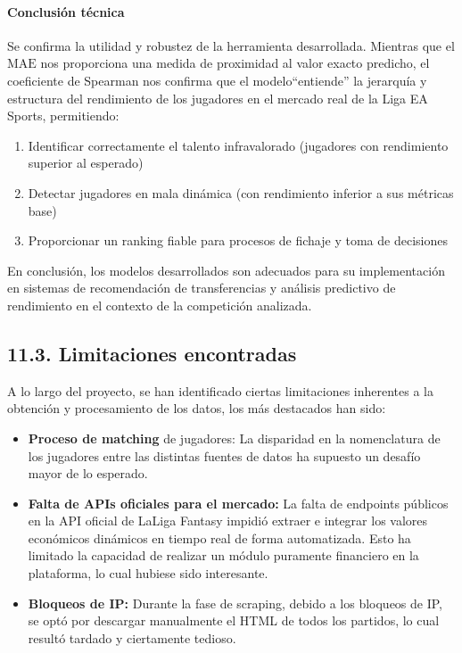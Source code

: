 \paragraph{Conclusión técnica}

Se confirma la utilidad y robustez de la herramienta
desarrollada. Mientras que el $\mathrm{MAE}$ nos proporciona una 
medida de proximidad al valor exacto predicho, el coeficiente de 
Spearman nos confirma que el modelo``entiende'' la 
jerarquía y estructura del rendimiento de los jugadores en el 
mercado real de la Liga EA Sports, permitiendo:

\begin{enumerate}
  \item Identificar correctamente el talento infravalorado
        (jugadores con rendimiento superior al esperado)
  
  \item Detectar jugadores en mala dinámica (con 
        rendimiento inferior a sus métricas base)
  
  \item Proporcionar un ranking fiable para procesos de 
        fichaje y toma de decisiones
\end{enumerate}

En conclusión, los modelos desarrollados son adecuados para su 
implementación en sistemas de recomendación de transferencias y 
análisis predictivo de rendimiento en el contexto de la 
competición analizada.

\subsection{11.3. Limitaciones encontradas}

A lo largo del proyecto, se han identificado ciertas limitaciones inherentes a la obtención y procesamiento de los datos, los más destacados han sido:
\begin{itemize}
    \item \textbf{Proceso de matching} de jugadores: La disparidad en la nomenclatura de los jugadores entre las distintas fuentes de datos ha supuesto un desafío mayor de lo esperado.
    \item \textbf{Falta de APIs oficiales para el mercado:} La falta de endpoints públicos en la API oficial de LaLiga Fantasy impidió extraer e integrar los valores económicos dinámicos en tiempo real de forma automatizada. Esto ha limitado la capacidad de realizar un módulo puramente financiero en la plataforma, lo cual hubiese sido interesante.
    \item \textbf{Bloqueos de IP:} Durante la fase de scraping, debido a los bloqueos de IP, se optó por descargar manualmente el HTML de todos los partidos, lo cual resultó tardado y ciertamente tedioso.
\end{itemize}

